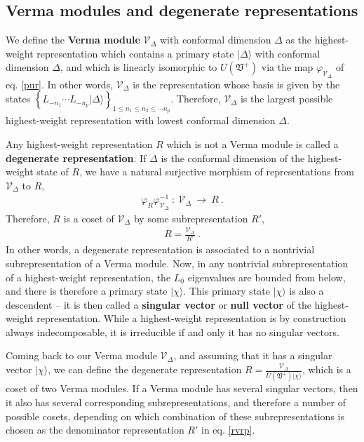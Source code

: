 \documentclass[12pt,a4paper,notitlepage]{report}
\numberwithin{equation}{section}
\theoremstyle{break}
\begin{document}
\subsection{Verma modules and degenerate representations \label{secvm}}

We define the \textbf{\boldmath Verma module} $\mathcal{V}_\Delta$ with conformal dimension $\Delta$ as the highest-weight representation which contains a primary state $|\Delta\rangle$ with conformal dimension $\Delta$, and which is linearly isomorphic to $U(\mathfrak{V}^+)$ via the map $\varphi_{\mathcal{V}_\Delta}$ of eq. \eqref{pur}.
In other words, $\mathcal{V}_\Delta$ is the representation whose basis is given by the states  $\left\{ L_{-n_1} \cdots L_{-n_p}|\Delta\rangle\right\}_{1\leq n_1\leq n_2\leq \cdots n_p}$.
Therefore, $\mathcal{V}_\Delta$ is the largest possible highest-weight representation with lowest conformal dimension $\Delta$. 

Any  highest-weight representation $R$ which is not a Verma module is called a \textbf{\boldmath degenerate representation}.
If $\Delta$ is the conformal dimension of the highest-weight state of $R$, we have a natural surjective morphism of representations from $\mathcal{V}_\Delta$ to $R$,
\begin{align}
\varphi_R \varphi_{\mathcal{V}_\Delta}^{-1}\ : \  \mathcal{V}_\Delta\ \rightarrow\ R \ .
\end{align}
Therefore, $R$ is a coset of $\mathcal{V}_\Delta$ by some subrepresentation $R'$,
\begin{align}
 R = \frac{\mathcal{V}_\Delta}{R'}\ .
\label{rvrp}
\end{align}
In other words, a degenerate representation is associated to a nontrivial subrepresentation of a Verma module.
Now, in any nontrivial subrepresentation of a highest-weight representation, the $L_0$ eigenvalues are bounded from below, and there is therefore a primary state $|\chi\rangle$.
This primary state $|\chi\rangle$ is also a descendent -- it is then called a \textbf{\boldmath singular vector} or \textbf{\boldmath null vector} of the highest-weight representation.
While a highest-weight representation is by construction always indecomposable, it is irreducible if and only it has no singular vectors.

Coming back to our Verma module $\mathcal{V}_\Delta$, and assuming that it has a singular vector $|\chi\rangle$, we can define the degenerate representation $R = \frac{\mathcal{V}_\Delta}{U(\mathfrak{V}^+)|\chi\rangle}$, which is a coset of two Verma modules.
If a Verma module has several singular vectors, then it also has several corresponding subrepresentations, and therefore a number of possible cosets, depending on which combination of these subrepresentations is chosen as the denominator representation $R'$ in eq. \eqref{rvrp}.
\end{document}
